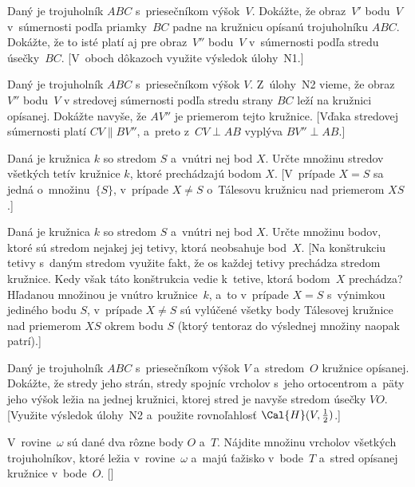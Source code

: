 {Daný je trojuholník $ABC$ s~priesečníkom výšok~$V$. Dokážte, že
obraz~$V'$ bodu~$V$ v~súmernosti podľa priamky~$BC$ padne na kružnicu opísanú
trojuholníku $ABC$. Dokážte, že to isté platí aj pre obraz~$V''$ bodu~$V$ v~súmernosti podľa stredu úsečky~$BC$.
[V~oboch dôkazoch využite výsledok úlohy~N1.]

Daný je trojuholník $ABC$ s~priesečníkom výšok $V$. Z~úlohy~N2 vieme,
že obraz $V''$ bodu~$V$ v stredovej súmernosti podľa stredu
strany $BC$ leží na kružnici opísanej. Dokážte navyše, že $AV''$ je
priemerom tejto kružnice.
[Vďaka stredovej súmernosti platí $CV\parallel
BV''$, a~preto z~$CV\perp AB$ vyplýva $BV''\perp AB$.]

Daná je kružnica $k$ so stredom $S$ a~vnútri nej bod $X$. Určte množinu
stredov všetkých tetív kružnice $k$, ktoré prechádzajú bodom $X$.
[V~prípade $X=S$ sa jedná o~množinu~$\{S\}$, v~prípade $X\ne S$
o~Tálesovu kružnicu nad priemerom $XS$.]

Daná je kružnica $k$ so stredom $S$ a~vnútri nej bod $X$. Určte množinu
bodov, ktoré sú stredom nejakej jej tetivy, ktorá neobsahuje bod~$X$.
[Na konštrukciu tetivy s~daným stredom využite fakt, že os každej
tetivy prechádza stredom kružnice. Kedy však táto konštrukcia vedie
k~tetive, ktorá bodom~$X$ prechádza? Hľadanou množinou je vnútro kružnice~$k$, a~to v~prípade $X=S$
s~výnimkou jediného bodu $S$, v~prípade $X\ne S$ sú vylúčené všetky
body Tálesovej kružnice nad priemerom $XS$ okrem bodu $S$ (ktorý tentoraz
do výslednej množiny naopak patrí).]

 Daný je trojuholník $ABC$
s~priesečníkom výšok $V$ a~stredom~$O$ kružnice opísanej. Dokážte, že stredy
jeho strán, stredy spojníc vrcholov s~jeho ortocentrom a~päty jeho výšok
ležia na jednej kružnici, ktorej stred je navyše stredom úsečky $VO$.
[Využite výsledok úlohy~N2 a~použite rovnoľahlosť
$\Cal{H}(V, \frac12)$.]


V~rovine~$\omega$ sú dané dva rôzne body $O$ a~$T$. Nájdite množinu vrcholov všetkých trojuholníkov, ktoré ležia v~rovine~$\omega$ a~majú ťažisko v~bode~$T$ a~stred opísanej kružnice v~bode~$O$.
[]
}

